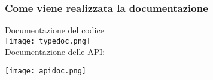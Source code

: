 \begin{frame}
  \frametitle{Come viene realizzata la documentazione}
  \centering
  Documentazione del codice \\
  \texttt{[image: typedoc.png]} \\
	Documentazione delle API:
  
  \texttt{[image: apidoc.png]}
\end{frame}
